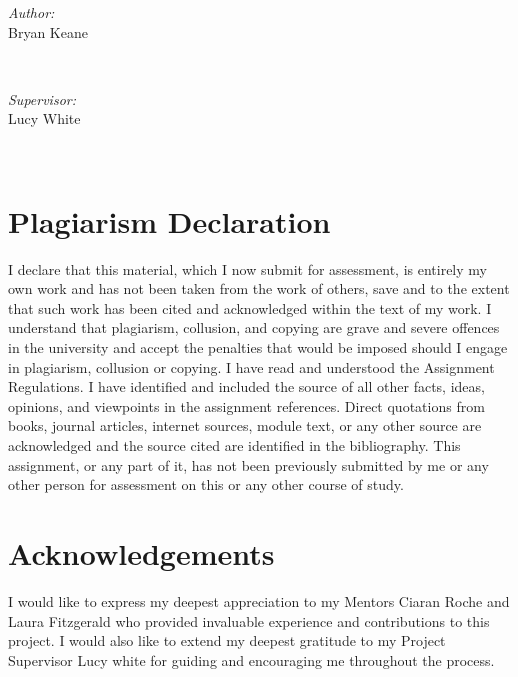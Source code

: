 \documentclass{article}
\begin{document}
\begin{titlepage}
    \begin{minipage}{0.4\textwidth}
    \begin{flushleft} \large
    \emph{Author:}\\
    Bryan Keane 
    \end{flushleft}
    \end{minipage}
    ~
    \begin{minipage}{0.4\textwidth}
    \begin{flushright} \large
    \emph{Supervisor:} \\
    Lucy White
    \end{flushright}
    \end{minipage}\\[2cm]
    
\end{titlepage}

\newpage

\tableofcontents
\newpage

\listoffigures
\newpage




\section{Plagiarism Declaration}
I declare that this material, which I now submit for assessment, is entirely my own work and has not been taken from the work of others, save and to the extent that such work has been cited and acknowledged within the text of my work. I understand that plagiarism, collusion, and copying are grave and severe offences in the university and accept the penalties that would be imposed should I engage in plagiarism, collusion or copying. I have read and understood the Assignment Regulations. I have identified and included the source of all other facts, ideas, opinions, and viewpoints in the assignment references. Direct quotations from books, journal articles, internet sources, module text, or any other source are acknowledged and the source cited are identified in the bibliography. This assignment, or any part of it, has not been previously submitted by me or any other person for assessment on this or any other course of study.  



\newpage
\section{Acknowledgements}
I would like to express my deepest appreciation to my Mentors Ciaran Roche and Laura Fitzgerald who provided invaluable experience and contributions to this project. I would also like to extend my deepest gratitude to my Project Supervisor Lucy white for guiding and encouraging me throughout the process.
\end{document}
